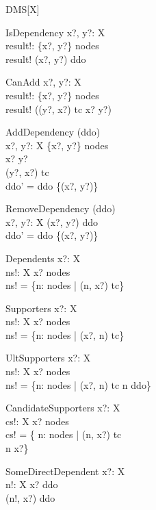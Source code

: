 \documentclass[11pt]{article}
\begin{document}
\begin{class}{DMS[X]}
\begin{op}{IsDependency}
  x?, y?:  X  \\
  result!:  \bool  
\where
  \{x?, y?\} \subseteq nodes \\ 
  result! \iff (x?, y?) \in ddo 
\end{op}\classbreak
\begin{op}{CanAdd}
  x?, y?:  X  \\
  result!:  \bool  
\where
  \{x?, y?\} \subseteq nodes \\ 
  result! \iff ((y?, x?) \notin tc \land x? \neq y?)
\end{op}\classbreak
\begin{op}{AddDependency}
  \Delta (ddo)\\
  x?, y?:  X  
\where
  \{x?, y?\} \subseteq nodes \\
  x? \neq y? \\
  (y?, x?) \notin tc \\ 
  ddo' = ddo \cup \{(x?, y?)\}
\end{op}\classbreak
\begin{op}{RemoveDependency}
  \Delta (ddo)\\
  x?, y?:  X  
\where
  (x?, y?) \in ddo \\ 
  ddo' = ddo \setminus \{(x?, y?)\}
\end{op}\classbreak
\begin{op}{Dependents}
  x?:  X  \\
  ns!:  \finset  X  
\where
  x? \in nodes \\ 
  ns! = \{n: nodes | (n, x?) \in tc\}
\end{op}\classbreak
\begin{op}{Supporters}
  x?:  X  \\
  ns!: \finset  X  
\where
  x? \in nodes \\ 
  ns! = \{n: nodes | (x?, n) \in tc\}
\end{op}\classbreak
\begin{op}{UltSupporters}
  x?:  X  \\
  ns!: \finset  X  
\where
  x? \in nodes \\ 
  ns! = \{n: nodes | (x?, n) \in tc \land n \notin  \dom ddo\}
\end{op}\classbreak
\begin{op}{CandidateSupporters}
  x?:  X  \\
  cs!:  \finset  X 
\where
  x? \in nodes \\ 
  cs! = \{ n: nodes | (n, x?) \notin tc \land \\ n \neq x?\}
\end{op}\classbreak
\begin{op}{SomeDirectDependent}
  x?:  X  \\
  n!:  X  
\where
  x? \in  \ran ddo \\ 
  (n!, x?) \in ddo
\end{op} 
\end{class} 
\end{document}
